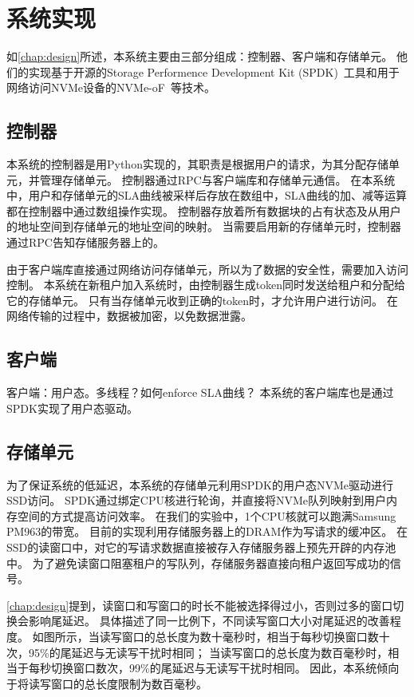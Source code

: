 
\chapter{系统实现}
\label{chap:impl}

如\autoref{chap:design}所述，本系统主要由三部分组成：控制器、客户端和存储单元。
他们的实现基于开源的Storage Performence Development Kit (SPDK)~\cite{yang2017spdk}工具和用于网络访问NVMe设备的NVMe-oF~\cite{nvmeof2016}等技术。

\section{控制器}
\label{sec:impl-controller}

本系统的控制器是用Python实现的，其职责是根据用户的请求，为其分配存储单元，并管理存储单元。
控制器通过RPC与客户端库和存储单元通信。
在本系统中，用户和存储单元的SLA曲线被采样后存放在数组中，SLA曲线的加、减等运算都在控制器中通过数组操作实现。
控制器存放着所有数据块的占有状态及从用户的地址空间到存储单元的地址空间的映射。
当需要启用新的存储单元时，控制器通过RPC告知存储服务器上的。

由于客户端库直接通过网络访问存储单元，所以为了数据的安全性，需要加入访问控制。
本系统在新租户加入系统时，由控制器生成token同时发送给租户和分配给它的存储单元。
只有当存储单元收到正确的token时，才允许用户进行访问。
在网络传输的过程中，数据被加密，以免数据泄露。

\section{客户端}
\label{sec:impl-client}

客户端：用户态。多线程？如何enforce SLA曲线？
本系统的客户端库也是通过SPDK实现了用户态驱动。

\section{存储单元}
\label{sec:impl-storage-unit}

为了保证系统的低延迟，本系统的存储单元利用SPDK的用户态NVMe驱动进行SSD访问。
SPDK通过绑定CPU核进行轮询，并直接将NVMe队列映射到用户内存空间的方式提高访问效率。
在我们的实验中，1个CPU核就可以跑满Samsung PM963的带宽。
目前的实现利用存储服务器上的DRAM作为写请求的缓冲区。
在SSD的读窗口中，对它的写请求数据直接被存入存储服务器上预先开辟的内存池中。
为了避免读窗口阻塞租户的写队列，存储服务器直接向租户返回写成功的信号。

\autoref{chap:design}提到，读窗口和写窗口的时长不能被选择得过小，否则过多的窗口切换会影响尾延迟。
具体描述了同一比例下，不同读写窗口大小对尾延迟的改善程度。
如图所示，当读写窗口的总长度为数十毫秒时，相当于每秒切换窗口数十次，95\%的尾延迟与无读写干扰时相同；
当读写窗口的总长度为数百毫秒时，相当于每秒切换窗口数次，99\%的尾延迟与无读写干扰时相同。
因此，本系统倾向于将读写窗口的总长度限制为数百毫秒。